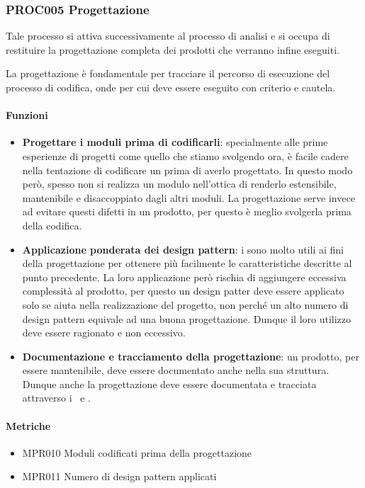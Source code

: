    \subsubsection{PROC005 Progettazione}\label{proc005}
    Tale processo si attiva successivamente al processo di analisi e si occupa di restituire la progettazione completa dei prodotti che verranno infine eseguiti. \par
    La progettazione è fondamentale per tracciare il percorso di esecuzione del processo di codifica, onde per cui deve essere eseguito con criterio e cautela.

        \paragraph{Funzioni}
        \begin{itemize}
            \item \textbf{Progettare i moduli prima di codificarli}: specialmente alle prime esperienze di progetti come quello che stiamo svolgendo ora, è facile cadere nella tentazione di codificare un  prima di averlo progettato. In questo modo però, spesso non si realizza un modulo nell'ottica di renderlo estensibile, mantenibile e disaccoppiato dagli altri moduli. La progettazione serve invece ad evitare questi difetti in un prodotto, per questo è meglio svolgerla prima della codifica.
            \item \textbf{Applicazione ponderata dei design pattern}: i  sono molto utili ai fini della progettazione per ottenere più facilmente le caratteristiche descritte al punto precedente. La loro applicazione però rischia di aggiungere eccessiva complessità al prodotto, per questo un design patter deve essere applicato solo se aiuta nella realizzazione del progetto, non perché un alto numero di design pattern equivale ad una buona progettazione. Dunque il loro utilizzo deve essere ragionato e non eccessivo.
            \item \textbf{Documentazione e tracciamento della progettazione}: un prodotto, per essere mantenibile, deve essere documentato anche nella sua struttura. Dunque anche la progettazione deve essere documentata e tracciata attraverso i \MUd\ e \MSd.
        \end{itemize}

        \paragraph{Metriche}
        \begin{itemize}
            \item MPR010 Moduli codificati prima della progettazione
            \item MPR011 Numero di design pattern applicati
        \end{itemize}

